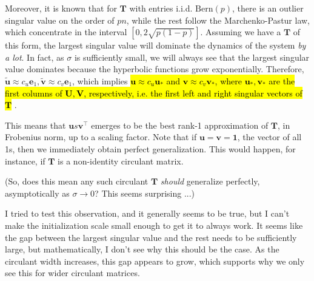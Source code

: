 \documentclass{article}
\begin{document}
Moreover, it is known that for $\bm{T}$ with entries i.i.d. $\text{Bern}(p)$, there is an outlier singular value on the order of $p n$, while the rest follow the Marchenko-Pastur law, which concentrate in the interval $[0, 2 \sqrt{p(1-p)}]$.
Assuming we have a $\bm{T}$ of this form, the largest singular value will dominate the dynamics of the system \emph{by a lot}.
In fact, as $\sigma$ is sufficiently small, we will always see that the largest singular value dominates because the hyperbolic functions grow exponentially.
Therefore, $\tilde{\bm{u}} \approx c_u \bm{e}_1, \tilde{\bm{v}} \approx c_v \bm{e}_1$, which implies \hl{ $\bm{u} \approx c_u \bm{u}_*$ and $\bm{v} \approx c_v \bm{v}_*$, where $\bm{u}_*, \bm{v}_*$ are the first columns of $\bm{U}, \bm{V}$, respectively, i.e. the first left and right singular vectors of $\bm{T}$ }.

This means that $\bm{u} s \bm{v}^\top$ emerges to be the best rank-1 approximation of $\bm{T}$, in Frobenius norm, up to a scaling factor.
Note that if $\bm{u} = \bm{v} = \bm{1}$, the vector of all 1s, then we immediately obtain perfect generalization.
This would happen, for instance, if $\bm{T}$ is a non-identity circulant matrix.

(So, does this mean any such circulant $\bm{T}$ \emph{should} generalize perfectly, asymptotically as $\sigma\to0$?
This seems surprising ...)

I tried to test this observation, and it generally seems to be true, but I can't make the initialization scale small enough to get it to always work.
It seems like the gap between the largest singular value and the rest needs to be sufficiently large, but mathematically, I don't see why this should be the case.
As the circulant width increases, this gap appears to grow, which supports why we only see this for wider circulant matrices.
\end{document}
